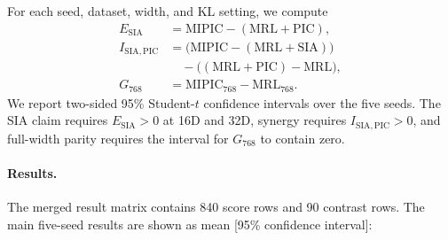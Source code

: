For each seed, dataset, width, and KL setting, we compute
\[
\begin{aligned}
E_{\mathrm{SIA}}&=\mathrm{MIPIC}-(\mathrm{MRL+PIC}),\\
I_{\mathrm{SIA,PIC}}&=\bigl(\mathrm{MIPIC}-(\mathrm{MRL+SIA})\bigr)\\
 &\quad-\bigl((\mathrm{MRL+PIC})-\mathrm{MRL}\bigr),\\
G_{768}&=\mathrm{MIPIC}_{768}-\mathrm{MRL}_{768}.
\end{aligned}
\]
We report two-sided 95\% Student-$t$ confidence intervals over the five
seeds.  The SIA claim requires $E_{\mathrm{SIA}}>0$ at 16D and 32D, synergy
requires $I_{\mathrm{SIA,PIC}}>0$, and full-width parity requires the
interval for $G_{768}$ to contain zero.

\paragraph{Results.}
The merged result matrix contains 840 score rows and 90 contrast rows.  The
main five-seed results are shown as mean [95\% confidence interval]:

\begin{table}[t]
\centering
\small
\setlength{\tabcolsep}{3pt}
%
\caption{Five-seed H4 contrasts. Each entry is a mean contrast in percentage
points across five seeds; values in brackets are two-sided 95\% Student-$t$
confidence intervals.}
\label{tab:h4}
\end{table}


